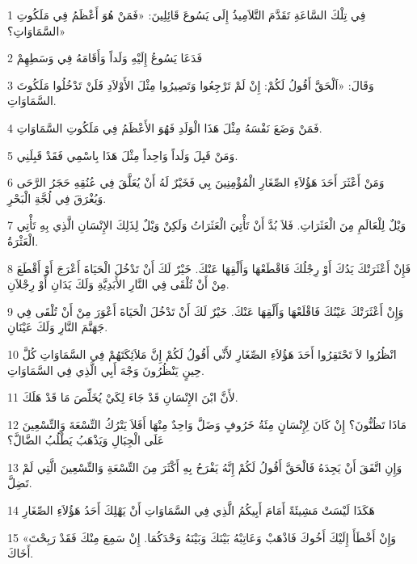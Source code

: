 \par 1 فِي تِلْكَ السَّاعَةِ تَقَدَّمَ التَّلاَمِيذُ إِلَى يَسُوعَ قَائِلِينَ: «فَمَنْ هُوَ أَعْظَمُ فِي مَلَكُوتِ السَّمَاوَاتِ؟»
\par 2 فَدَعَا يَسُوعُ إِلَيْهِ وَلَداً وَأَقَامَهُ فِي وَسَطِهِمْ
\par 3 وَقَالَ: «اَلْحَقَّ أَقُولُ لَكُمْ: إِنْ لَمْ تَرْجِعُوا وَتَصِيرُوا مِثْلَ الأَوْلاَدِ فَلَنْ تَدْخُلُوا مَلَكُوتَ السَّمَاوَاتِ.
\par 4 فَمَنْ وَضَعَ نَفْسَهُ مِثْلَ هَذَا الْوَلَدِ فَهُوَ الأَعْظَمُ فِي مَلَكُوتِ السَّمَاوَاتِ.
\par 5 وَمَنْ قَبِلَ وَلَداً وَاحِداً مِثْلَ هَذَا بِاسْمِي فَقَدْ قَبِلَنِي.
\par 6 وَمَنْ أَعْثَرَ أَحَدَ هَؤُلاَءِ الصِّغَارِ الْمُؤْمِنِينَ بِي فَخَيْرٌ لَهُ أَنْ يُعَلَّقَ فِي عُنُقِهِ حَجَرُ الرَّحَى وَيُغْرَقَ فِي لُجَّةِ الْبَحْرِ.
\par 7 وَيْلٌ لِلْعَالَمِ مِنَ الْعَثَرَاتِ. فَلاَ بُدَّ أَنْ تَأْتِيَ الْعَثَرَاتُ وَلَكِنْ وَيْلٌ لِذَلِكَ الإِنْسَانِ الَّذِي بِهِ تَأْتِي الْعَثْرَةُ.
\par 8 فَإِنْ أَعْثَرَتْكَ يَدُكَ أَوْ رِجْلُكَ فَاقْطَعْهَا وَأَلْقِهَا عَنْكَ. خَيْرٌ لَكَ أَنْ تَدْخُلَ الْحَيَاةَ أَعْرَجَ أَوْ أَقْطَعَ مِنْ أَنْ تُلْقَى فِي النَّارِ الأَبَدِيَّةِ وَلَكَ يَدَانِ أَوْ رِجْلاَنِ.
\par 9 وَإِنْ أَعْثَرَتْكَ عَيْنُكَ فَاقْلَعْهَا وَأَلْقِهَا عَنْكَ. خَيْرٌ لَكَ أَنْ تَدْخُلَ الْحَيَاةَ أَعْوَرَ مِنْ أَنْ تُلْقَى فِي جَهَنَّمَ النَّارِ وَلَكَ عَيْنَانِ.
\par 10 انْظُرُوا لاَ تَحْتَقِرُوا أَحَدَ هَؤُلاَءِ الصِّغَارِ لأَنِّي أَقُولُ لَكُمْ إِنَّ مَلاَئِكَتَهُمْ فِي السَّمَاوَاتِ كُلَّ حِينٍ يَنْظُرُونَ وَجْهَ أَبِي الَّذِي فِي السَّمَاوَاتِ.
\par 11 لأَنَّ ابْنَ الإِنْسَانِ قَدْ جَاءَ لِكَيْ يُخَلِّصَ مَا قَدْ هَلَكَ.
\par 12 مَاذَا تَظُنُّونَ؟ إِنْ كَانَ لِإِنْسَانٍ مِئَةُ خَرُوفٍ وَضَلَّ وَاحِدٌ مِنْهَا أَفَلاَ يَتْرُكُ التِّسْعَةَ وَالتِّسْعِينَ عَلَى الْجِبَالِ وَيَذْهَبُ يَطْلُبُ الضَّالَّ؟
\par 13 وَإِنِ اتَّفَقَ أَنْ يَجِدَهُ فَالْحَقَّ أَقُولُ لَكُمْ إِنَّهُ يَفْرَحُ بِهِ أَكْثَرَ مِنَ التِّسْعَةِ وَالتِّسْعِينَ الَّتِي لَمْ تَضِلَّ.
\par 14 هَكَذَا لَيْسَتْ مَشِيئَةً أَمَامَ أَبِيكُمُ الَّذِي فِي السَّمَاوَاتِ أَنْ يَهْلِكَ أَحَدُ هَؤُلاَءِ الصِّغَارِ
\par 15 «وَإِنْ أَخْطَأَ إِلَيْكَ أَخُوكَ فَاذْهَبْ وَعَاتِبْهُ بَيْنَكَ وَبَيْنَهُ وَحْدَكُمَا. إِنْ سَمِعَ مِنْكَ فَقَدْ رَبِحْتَ أَخَاكَ.
